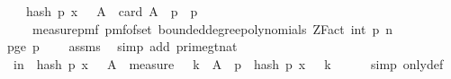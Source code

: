 \begin{isabellebody}
\ \ \ \ hash\ p\ x\ {\isasymomega}\ {\isasymin}\ A{\isacharparenright}{\kern0pt}\ {\isacharequal}{\kern0pt}\ card\ {\isacharparenleft}{\kern0pt}A\ {\isasyminter}\ {\isacharbraceleft}{\kern0pt}{}{\isachardot}{\kern0pt}{\isachardot}{\kern0pt}{\isacharless}{\kern0pt}p{\isacharbraceright}{\kern0pt}{\isacharparenright}{\kern0pt}\ {\isacharslash}{\kern0pt}\ p{\isachardoublequoteclose}\isanewline
%
\isadelimproof
%
\endisadelimproof
%
\isatagproof
{}\isamarkupfalse%
\ {\isacharminus}{\kern0pt}\isanewline
\ \ \isamarkupfalse%
\ {\isasymOmega}\ \ {\isachardoublequoteopen}{\isasymOmega}\ {\isacharequal}{\kern0pt}\ measure{\isacharunderscore}{\kern0pt}pmf\ {\isacharparenleft}{\kern0pt}pmf{\isacharunderscore}{\kern0pt}of{\isacharunderscore}{\kern0pt}set\ {\isacharparenleft}{\kern0pt}bounded{\isacharunderscore}{\kern0pt}degree{\isacharunderscore}{\kern0pt}polynomials\ {\isacharparenleft}{\kern0pt}ZFact\ {\isacharparenleft}{\kern0pt}int\ p{\isacharparenright}{\kern0pt}{\isacharparenright}{\kern0pt}\ n{\isacharparenright}{\kern0pt}{\isacharparenright}{\kern0pt}{\isachardoublequoteclose}\isanewline
\ \ \isamarkupfalse%
\ p{\isacharunderscore}{\kern0pt}ge{\isacharunderscore}{\kern0pt}{}{\isacharcolon}{\kern0pt}\ {\isachardoublequoteopen}p\ {\isachargreater}{\kern0pt}\ {}{\isachardoublequoteclose}\ \isamarkupfalse%
\ assms{\isacharparenleft}{\kern0pt}{}{\isacharparenright}{\kern0pt}\ \isamarkupfalse%
\ {\isacharparenleft}{\kern0pt}simp\ add{\isacharcolon}{\kern0pt}\ prime{\isacharunderscore}{\kern0pt}gt{\isacharunderscore}{\kern0pt}{}{\isacharunderscore}{\kern0pt}nat{\isacharparenright}{\kern0pt}\isanewline
\isanewline
\ \ \isamarkupfalse%
\ {\isachardoublequoteopen}{\isasymP}{\isacharparenleft}{\kern0pt}{\isasymomega}\ in\ {\isasymOmega}{\isachardot}{\kern0pt}\ hash\ p\ x\ {\isasymomega}\ {\isasymin}\ A{\isacharparenright}{\kern0pt}\ {\isacharequal}{\kern0pt}\ measure\ {\isasymOmega}\ {\isacharparenleft}{\kern0pt}{\isasymUnion}\ k\ {\isasymin}\ A\ {\isasyminter}\ {\isacharbraceleft}{\kern0pt}{}{\isachardot}{\kern0pt}{\isachardot}{\kern0pt}{\isacharless}{\kern0pt}p{\isacharbraceright}{\kern0pt}{\isachardot}{\kern0pt}\ {\isacharbraceleft}{\kern0pt}{\isasymomega}{\isachardot}{\kern0pt}\ hash\ p\ x\ {\isasymomega}\ {\isacharequal}{\kern0pt}\ k{\isacharbraceright}{\kern0pt}{\isacharparenright}{\kern0pt}{\isachardoublequoteclose}\isanewline
\ \ \ \ \isamarkupfalse%
\ {\isacharparenleft}{\kern0pt}simp\ only{\isacharcolon}{\kern0pt}{\isasymOmega}{\isacharunderscore}{\kern0pt}def{\isacharparenright}{\kern0pt}\isanewline

\end{isabellebody}
